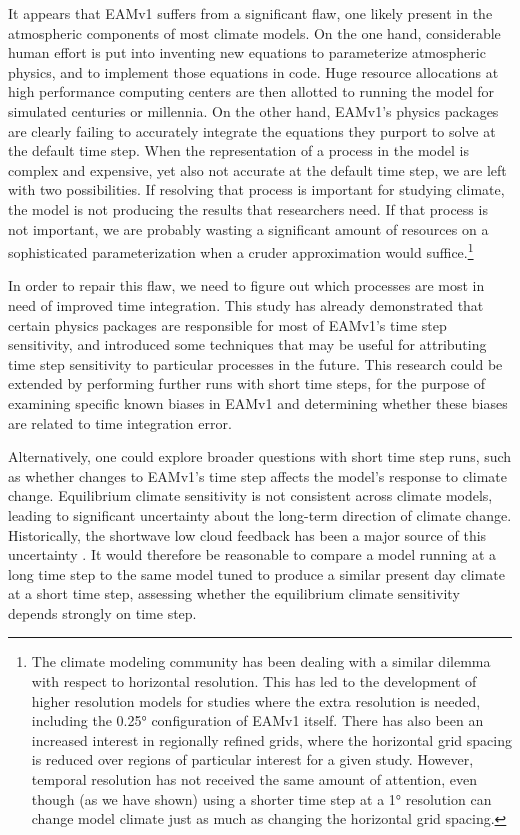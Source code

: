 \documentclass [11pt, proquest] {uwthesis}[2020/02/24]
\begin{document}
It appears that EAMv1 suffers from a significant flaw, one likely present in the atmospheric components of most climate models. On the one hand, considerable human effort is put into inventing new equations to parameterize atmospheric physics, and to implement those equations in code. Huge resource allocations at high performance computing centers are then allotted to running the model for simulated centuries or millennia. On the other hand, EAMv1's physics packages are clearly failing to accurately integrate the equations they purport to solve at the default time step. When the representation of a process in the model is complex and expensive, yet also not accurate at the default time step, we are left with two possibilities. If resolving that process is important for studying climate, the model is not producing the results that researchers need. If that process is not important, we are probably wasting a significant amount of resources on a sophisticated parameterization when a cruder approximation would suffice.\footnote{The climate modeling community has been dealing with a similar dilemma with respect to horizontal resolution. This has led to the development of higher resolution models for studies where the extra resolution is needed, including the \ang{0.25} configuration of EAMv1 itself. There has also been an increased interest in regionally refined grids, where the horizontal grid spacing is reduced over regions of particular interest for a given study. However, temporal resolution has not received the same amount of attention, even though (as we have shown) using a shorter time step at a \ang{1} resolution can change model climate just as much as changing the horizontal grid spacing.}

In order to repair this flaw, we need to figure out which processes are most in need of improved time integration. This study has already demonstrated that certain physics packages are responsible for most of EAMv1's time step sensitivity, and introduced some techniques that may be useful for attributing time step sensitivity to particular processes in the future. This research could be extended by performing further runs with short time steps, for the purpose of examining specific known biases in EAMv1 and determining whether these biases are related to time integration error.

Alternatively, one could explore broader questions with short time step runs, such as whether changes to EAMv1's time step affects the model's response to climate change. Equilibrium climate sensitivity is not consistent across climate models, leading to significant uncertainty about the long-term direction of climate change. Historically, the shortwave low cloud feedback has been a major source of this uncertainty \parencite{Bony2005,Andrews2012,Zelinka2020}. It would therefore be reasonable to compare a model running at a long time step to the same model tuned to produce a similar present day climate at a short time step, assessing whether the equilibrium climate sensitivity depends strongly on time step.
\end{document}
